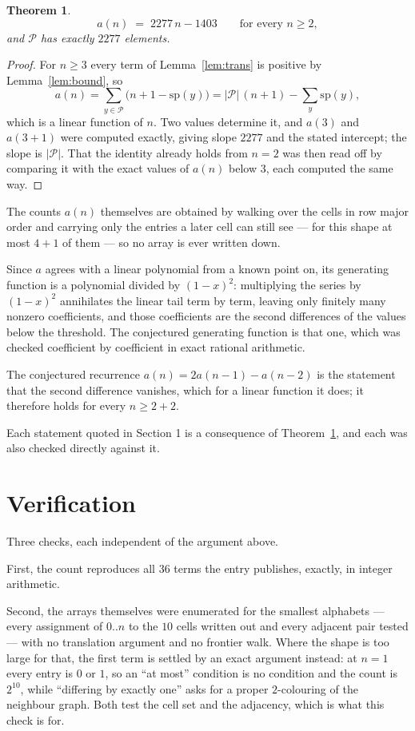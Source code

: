 \documentclass[11pt,a4paper]{article}
\theoremstyle{plain}
\newtheorem{theorem}{Theorem}
\theoremstyle{definition}
\begin{document}
\begin{theorem}\label{thm:line}
\[
a(n)\;=\;2277\,n-1403\qquad\text{for every }n\ge2,
\]
and $\mathcal P$ has exactly $2277$ elements.
\end{theorem}

\begin{proof}
For $n\ge3$ every term of Lemma~\ref{lem:trans} is positive by
Lemma~\ref{lem:bound}, so
\[
a(n)=\sum_{y\in\mathcal P}\bigl(n+1-\mathrm{sp}(y)\bigr)
=|\mathcal P|\,(n+1)-\sum_{y}\mathrm{sp}(y),
\]
which is a linear function of $n$. Two values determine it, and $a(3)$ and
$a(3+1)$ were computed exactly, giving slope $2277$ and the stated intercept; the slope
is $|\mathcal P|$. That the identity already holds from $n=2$ was then read off by
comparing it with the exact values of $a(n)$ below $3$, each computed the same way.
\end{proof}

The counts $a(n)$ themselves are obtained by walking over the cells in row major order and
carrying only the entries a later cell can still see --- for this shape at most $4+1$ of
them --- so no array is ever written down.

Since $a$ agrees with a linear polynomial from a known point on, its generating function is a
polynomial divided by $(1-x)^2$: multiplying the series by $(1-x)^2$ annihilates the linear
tail term by term, leaving only finitely many nonzero coefficients, and those coefficients are
the second differences of the values below the threshold. The conjectured generating function
is that one, which was checked coefficient by coefficient in exact rational arithmetic.

The conjectured recurrence $a(n)=2a(n-1)-a(n-2)$ is the statement that the second difference
vanishes, which for a linear function it does; it therefore holds for every $n\ge2+2$.

Each statement quoted in Section 1 is a consequence of Theorem~\ref{thm:line}, and each was
also checked directly against it.

\section{Verification}

Three checks, each independent of the argument above.

First, the count reproduces all $36$ terms the entry publishes, exactly, in integer
arithmetic.

Second, the arrays themselves were enumerated for the smallest alphabets --- every assignment
of $0..n$ to the $10$ cells written out and every adjacent pair tested --- with no
translation argument and no frontier walk. Where the shape is too large for that, the first
term is settled by an exact argument instead: at $n=1$ every entry is $0$ or $1$, so an ``at
most'' condition is no condition and the count is $2^{10}$, while ``differing by exactly
one'' asks for a proper $2$-colouring of the neighbour graph. Both test the cell set and the
adjacency, which is what this check is for.
\end{document}
